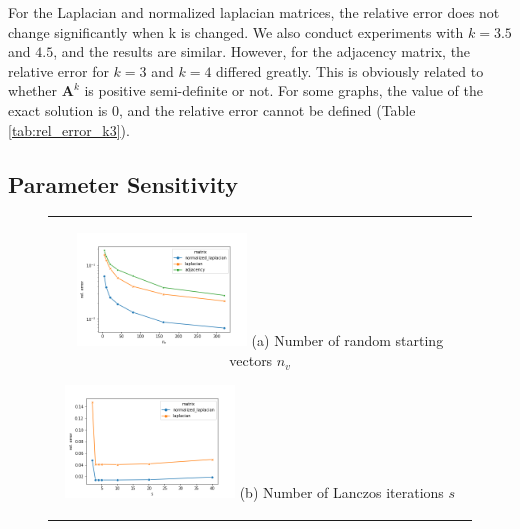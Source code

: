 \documentclass[senior,final,11pt]{iscs-thesis}
\begin{document}
For the Laplacian and normalized laplacian matrices, the relative error does not change significantly when k is changed. We also conduct experiments with $k = 3.5$ and $4.5$, and the results are similar. However, for the adjacency matrix, the relative error for $k=3$ and $k=4$ differed greatly. This is obviously related to whether ${\mathbf A}^k$ is positive semi-definite or not. For some graphs, the value of the exact solution is 0, and the relative error cannot be defined (Table \ref{tab:rel_error_k3}).

\subsection{Parameter Sensitivity}

\begin{figure}[htbp]
    \begin{center}
      \begin{tabular}{c}

        \begin{minipage}{0.33\hsize}
            \begin{center}
              \includegraphics[clip, width=4.5cm]{./figure/plot_param_nv.png}
              \hspace{1.6cm} (a) Number of random starting vectors $n_v$
            \end{center}
        \end{minipage}

        \begin{minipage}{0.33\hsize}
          \begin{center}
            \includegraphics[clip, width=4.5cm]{./figure/plot_param_s.png}
            \hspace{1.6cm} (b) Number of Lanczos iterations $s$
          \end{center}
        \end{minipage}


\end{tabular}
\end{center}
\end{figure}
\end{document}
